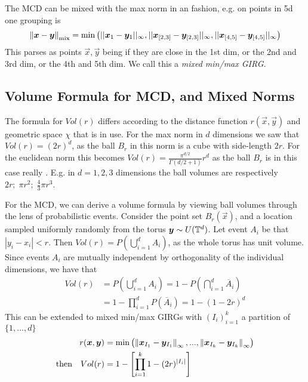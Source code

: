 The MCD can be mixed with the max norm in an  fashion, e.g. on points in 5d one grouping is
\begin{equation}
    \left\lVert \bm{x} - \bm{y}\right\rVert_\text{mix} = \min \left ( ||\bm{x}_1 - \bm{y}_{1}||_\infty, ||\bm{x}_{[2,3]} - \bm{y}_{[2,3]}||_\infty, ||\bm{x}_{[4,5]} - \bm{y}_{[4,5]}||_\infty \right )
\end{equation}
This parses as points $\vec{x}, \vec{y}$ being  if they are close in the 1st dim, or the 2nd and 3rd dim, or the 4th and 5th dim. We call this a \textit{mixed min/max GIRG}.


\subsection{Volume Formula for MCD, and Mixed Norms}
The formula for $Vol(r)$ differs according to the distance function $r(\vec{x}, \vec{y})$ and geometric space $\chi$ that is in use. For the max norm in $d$ dimensions we saw that $Vol(r) = (2r)^d$, as the ball $B_r$ in this norm is a cube with side-length $2r$. For the euclidean norm this becomes $Vol(r) = \frac{\pi^{d/2}}{\Gamma(d/2 + 1)} r^d$ as the ball $B_r$ is in this case really . E.g. in $d=1,2,3$ dimensions the ball volumes are respectively $2r;\; \pi r^2;\; \frac{4}{3} \pi r^3$.

For the MCD, we can derive a volume formula by viewing ball volumes through the lens of probabilistic events. Consider the point set $B_r(\vec{x})$, and a location sampled uniformly randomly from the torus $\bm{y} \sim U(\mathbb{T}^d)$.
Let event $A_i$ be that $|y_i - x_i| < r$.
Then $Vol(r) = P(\bigcup_{i=1}^d A_i)$, as the whole torus has unit volume.
Since events $A_i$ are mutually independent by orthogonality of the individual dimensions,
we have that
\begin{align}
    Vol(r) & = P \left (\bigcup_{i=1}^d A_i \right ) 
    = 1 - P \left ( \bigcap_{i=1}^d \overline{A}_i \right )
    \\
    &= 1 - \prod_{i=1}^d P(\overline{A}_i) = 1 - (1 - 2r)^d
\end{align}
This can be extended to mixed min/max GIRGs with $(I_i)_{i=1}^k$ a partition of $\{1, ..., d\}$
\begin{align}
    r(\bm{x}, \bm{y}) &= \min \left ( \left\lVert \bm{x}_{I_1} - \bm{y}_{I_1}\right\rVert_\infty, ..., \left\lVert \bm{x}_{I_k} - \bm{y}_{I_k}\right\rVert_\infty  \right )
    \\
    \text{then}\quad Vol(r) &= 1 -  \left [ \prod_{i=1}^k 1 - (2r)^{|I_i|} \right ]
\end{align}

